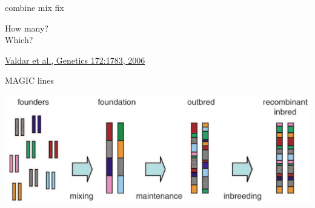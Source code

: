 \documentclass[12pt]{article}
\newcommand{\headsize}{\fontsize{35}{35} \selectfont}
\newcommand{\smallsize}{\fontsize{25}{30} \selectfont}
\newcommand{\smallersize}{\fontsize{20}{25} \selectfont}
\newcommand{\citesize}{\fontsize{14}{18} \selectfont}
\begin{document}
\smallsize \color{myyellow}
\hspace*{52mm} combine \hspace*{35mm} mix \hspace*{52mm} fix

\smallersize
\color{mywhite}
\vspace{20pt}

\hspace*{6mm}
\begin{minipage}[t]{45mm}
\vspace*{0mm}
\centering

How many? \\[20pt]
Which?
\end{minipage}
\hspace{57mm}
\begin{minipage}[t]{45mm}
\vspace*{0mm}
\centering

\end{minipage}
\hspace{18mm}
\begin{minipage}[t]{45mm}
\vspace*{0mm}
\centering


\end{minipage}


\vfill

\hfill {\citesize \color{citecolor} \href{http://www.genetics.org/content/172/3/1783.full}{Valdar et al., Genetics 172:1783, 2006}}

\vspace*{5mm}


\newpage

\addtocounter{page}{-1}

\headsize \color{myyellow}
\hfill \begin{minipage}{5.75in}
\centering
MAGIC lines
\end{minipage}

\vspace{20mm}

\centerline{\includegraphics[width=10in]{Figs/valdar_genet2006.png}}
\end{document}
